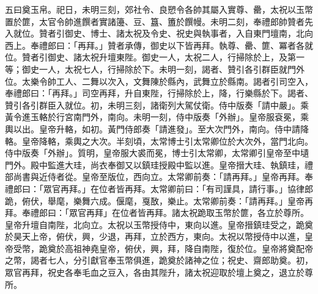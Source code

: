 \begin{pinyinscope}
 五曰奠玉帛。祀日，未明三刻，郊社令、良愬令各帥其屬入實尊、罍，太祝以玉幣置於篚，太官令帥進饌者實諸籩、豆、簋、簠於饌幔。未明二刻，奉禮郎帥贊者先入就位。贊者引御史、博士、諸太祝及令史、祝史與執事者，入自東門壇南，北向西上。奉禮郎曰：「再拜。」贊者承傳，御史以下皆再拜。執尊、罍、篚、冪者各就位。贊者引御史、諸太祝升壇東陛。御史一人，太祝二人，行掃除於上，及第一等；御史一人，太祝七人，行掃除於下。未明一刻，謁者、贊引各引群臣就門外位。太樂令帥工人、二舞以次入，文舞陳於縣內，武舞立於縣南。謁者引司空入，奉禮郎曰：「再拜。」司空再拜，升自東陛，行掃除於上，降，行樂縣於下。謁者、贊引各引群臣入就位。初，未明三刻，諸衛列大駕仗衛。侍中版奏「請中嚴」。乘黃令進玉輅於行宮南門外，南向。未明一刻，侍中版奏「外辦」。皇帝服袞冕，乘輿以出。皇帝升輅，如初。黃門侍郎奏「請進發」。至大次門外，南向。侍中請降輅。皇帝降輅，乘輿之大次。半刻頃，太常博士引太常卿位於大次外，當門北向。侍中版奏「外辦」。質明，皇帝服大裘而冕，博士引太常卿，太常卿引皇帝至中壝門外。殿中監進大珪，尚衣奉御又以鎮珪授殿中監以進。皇帝搢大珪、執鎮珪，禮部尚書與近侍者從。皇帝至版位，西向立。太常卿前奏：「請再拜。」皇帝再拜。奉禮郎曰：「眾官再拜。」在位者皆再拜。太常卿前曰：「有司謹具，請行事。」協律郎跪，俯伏，舉麾，樂舞六成。偃麾，戛敔，樂止。太常卿前奏：「請再拜。」皇帝再拜。奉禮郎曰：「眾官再拜」在位者皆再拜。諸太祝跪取玉幣於篚，各立於尊所。皇帝升壇自南陛，北向立。太祝以玉幣授侍中，東向以進。皇帝搢鎮珪受之，跪奠於昊天上帝，俯伏，興，少退，再拜，立於西方，東向。太祝以幣授侍中以進，皇帝受幣，跪奠於高祖神堯皇帝，俯伏，興，拜，降自南陛，復於位。皇帝將奠配帝之幣，謁者七人，分引獻官奉玉幣俱進，跪奠於諸神之位；祝史、齋郎助奠。初，眾官再拜，祝史各奉毛血之豆入，各由其陛升，諸太祝迎取於壇上奠之，退立於尊所。




\end{pinyinscope}
